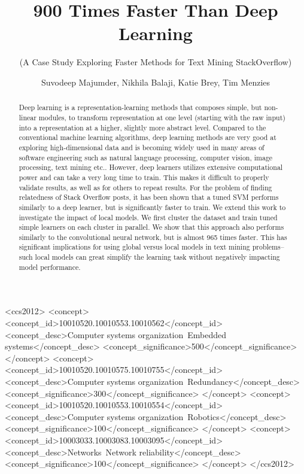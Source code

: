 \documentclass[sigconf]{acmart}
\theoremstyle{break}
\begin{document}
\title{ 900 Times Faster Than Deep Learning} 
\subtitle{(A Case Study Exploring Faster   Methods for Text Mining StackOverflow)}


\author{Suvodeep Majumder, Nikhila Balaji, Katie Brey, Tim Menzies}  

 
 \pagestyle{plain}

\renewcommand{\shortauthors}{S. Majumder et al.}


\begin{abstract}
Deep learning is a representation-learning methods that composes simple, but non-linear modules, to transform  representation at one level (starting with the raw input) into a representation at a higher, slightly more abstract level. Compared to the conventional machine learning algorithms, deep learning methods are very good at exploring high-dimensional data and is becoming widely used in many areas of software engineering such as natural language processing, computer vision, image processing, text mining etc.. However, deep learners utilizes extensive computational power and can take a very long time to train. This makes it difficult to properly validate results, as well as for others to repeat results. For the problem of finding relatedness of Stack Overflow posts, it has been shown that a tuned SVM performs similarly to a deep learner, but is significantly faster to train. We extend this work to investigate the impact of local models. We first cluster the dataset and train tuned simple learners on each cluster in parallel. We show that this approach also performs similarly to the convolutional neural network, but is almost 965 times faster. This has significant implications for using global versus local models in  text mining problems-- such local models
can     great simplify the learning task   without  negatively  impacting   model performance.
\end{abstract}

%
%
\begin{CCSXML}
<ccs2012>
 <concept>
  <concept_id>10010520.10010553.10010562</concept_id>
  <concept_desc>Computer systems organization~Embedded systems</concept_desc>
  <concept_significance>500</concept_significance>
 </concept>
 <concept>
  <concept_id>10010520.10010575.10010755</concept_id>
  <concept_desc>Computer systems organization~Redundancy</concept_desc>
  <concept_significance>300</concept_significance>
 </concept>
 <concept>
  <concept_id>10010520.10010553.10010554</concept_id>
  <concept_desc>Computer systems organization~Robotics</concept_desc>
  <concept_significance>100</concept_significance>
 </concept>
 <concept>
  <concept_id>10003033.10003083.10003095</concept_id>
  <concept_desc>Networks~Network reliability</concept_desc>
  <concept_significance>100</concept_significance>
 </concept>
</ccs2012>  
\end{CCSXML}
\end{document}
